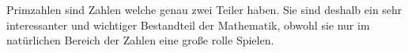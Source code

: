 Primzahlen sind Zahlen welche genau zwei Teiler haben. Sie sind deshalb ein sehr interessanter und wichtiger Bestandteil der Mathematik, obwohl sie nur im natürlichen Bereich der Zahlen eine große rolle Spielen.
			
